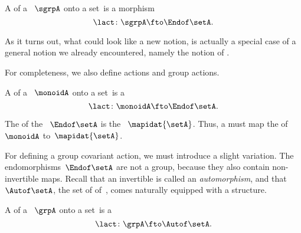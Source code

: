 \begin{ctdefinition}
    \label{def:semigroup-cov-action}
    A  of a ~$\sgrpA$ onto a set~\setA is a  morphism
    \begin{equation}
        \label{eq:act-semigroup}
        \lact \colon \sgrpA \fto \Endof\setA.
    \end{equation}
\end{ctdefinition}

As it turns out, what could look like a new notion, is actually a special case of a general notion we already encountered, namely the notion of .

For completeness, we also define  actions and group actions.

\begin{ctdefinition}
    \label{def:monoid-cov-action}
    A  of a  ~$\monoidA$ onto a set~\setA is a 
    \begin{equation}
        \label{eq:act-monoid}
        \lact \colon \monoidA \fto \Endof\setA.
    \end{equation}
\end{ctdefinition}

The  of the  ~$\Endof\setA$ is the ~$\mapidat{\setA}$.
Thus, a  must map the  of~$\monoidA$ to~$\mapidat{\setA}$.
%

For defining a group covariant action, we must introduce a slight variation.
The endomorphisms~$\Endof\setA$ are not a group, because they also contain non-invertible maps.
Recall that an invertible  is called an \emph{automorphism}, and that~$\Autof\setA$, the set of  of~\setA, comes naturally equipped with a  structure.


\begin{ctdefinition}
    \label{def:group-cov-action}
    A  of a ~$\grpA$ onto a set~\setA is a 
    \begin{equation}
        \label{eq:act-group}
        \lact \colon \grpA \fto \Autof\setA.
    \end{equation}
\end{ctdefinition}

